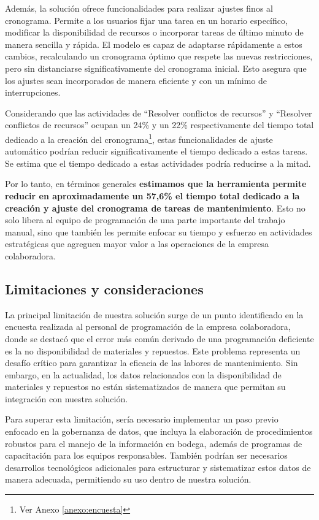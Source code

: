 \documentclass{article}
\begin{document}
Además, la solución ofrece funcionalidades para realizar ajustes finos al cronograma. Permite a los usuarios fijar una tarea en un horario específico, modificar la disponibilidad de recursos o incorporar tareas de último minuto de manera sencilla y rápida. El modelo es capaz de adaptarse rápidamente a estos cambios, recalculando un cronograma óptimo que respete las nuevas restricciones, pero sin distanciarse significativamente del cronograma inicial. Esto asegura que los ajustes sean incorporados de manera eficiente y con un mínimo de interrupciones.


Considerando que las actividades de ``Resolver conflictos de recursos'' y ``Resolver conflictos de recursos'' ocupan un 24\% y un 22\% respectivamente del tiempo total dedicado a la creación del cronograma\footnote{Ver Anexo \ref{anexo:encuesta}}, estas funcionalidades de ajuste automático podrían reducir significativamente el tiempo dedicado a estas tareas. Se estima que el tiempo dedicado a estas actividades podría reducirse a la mitad.

Por lo tanto, en términos generales \textbf{estimamos que la herramienta permite reducir en aproximadamente un 57,6\%  el tiempo total dedicado a la creación y ajuste del cronograma de tareas de mantenimiento}. Esto no solo libera al equipo de programación de una parte importante del trabajo manual, sino que también les permite enfocar su tiempo y esfuerzo en actividades estratégicas que agreguen mayor valor a las operaciones de la empresa colaboradora.

\subsection{Limitaciones y consideraciones}

La principal limitación de nuestra solución surge de un punto identificado en la encuesta realizada al personal de programación de la empresa colaboradora, donde se destacó que el error más común derivado de una programación deficiente es la no disponibilidad de materiales y repuestos. Este problema representa un desafío crítico para garantizar la eficacia de las labores de mantenimiento. Sin embargo, en la actualidad, los datos relacionados con la disponibilidad de materiales y repuestos no están sistematizados de manera que permitan su integración con nuestra solución.

Para superar esta limitación, sería necesario implementar un paso previo enfocado en la gobernanza de datos, que incluya la elaboración de procedimientos robustos para el manejo de la información en bodega, además de programas de capacitación para los equipos responsables. También podrían ser necesarios desarrollos tecnológicos adicionales para estructurar y sistematizar estos datos de manera adecuada, permitiendo su uso dentro de nuestra solución.
\end{document}
